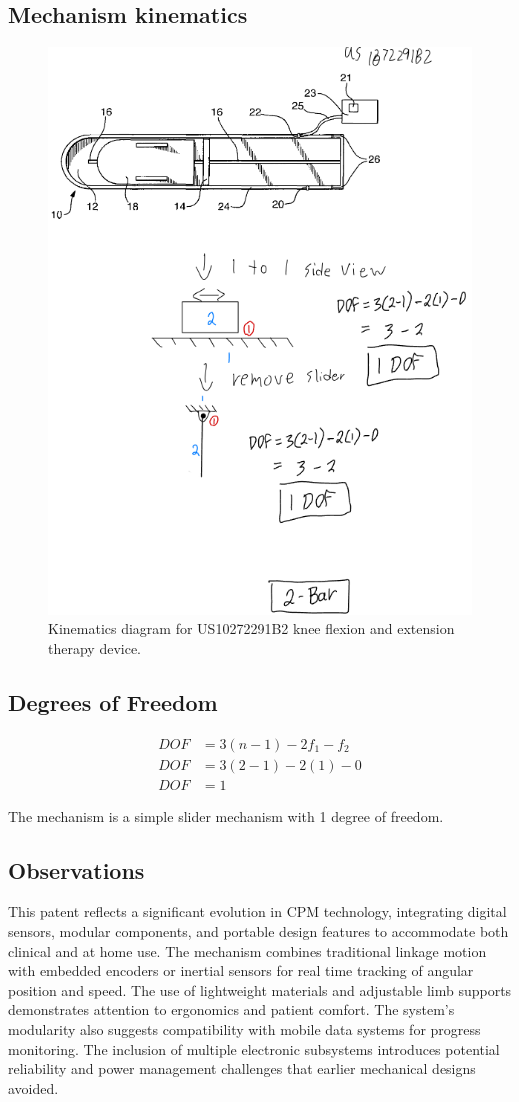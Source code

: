 \documentclass[11pt]{article}
\begin{document}
\subsection{Mechanism kinematics}
\begin{figure}[H]
  \centering
  \includegraphics[width=0.54\linewidth]{../Kinematic Mechanism Images/10272291.png}
  \caption{Kinematics diagram for US10272291B2 knee flexion and extension therapy device.}
  \label{fig:US10272291B2_kinematics}
\end{figure}

\subsection{Degrees of Freedom}
\[
\begin{aligned}
DOF &= 3(n-1) - 2f_1 - f_2 \\
DOF &= 3(2-1) - 2(1) - 0 \\
DOF &= 1
\end{aligned}
\]

The mechanism is a simple slider mechanism with 1 degree of freedom.

\subsection{Observations}
This patent reflects a significant evolution in CPM technology, integrating digital sensors, modular components, and portable design features to accommodate both clinical and at home use. The mechanism combines traditional linkage motion with embedded encoders or inertial sensors for real time tracking of angular position and speed. The use of lightweight materials and adjustable limb supports demonstrates attention to ergonomics and patient comfort. The system's modularity also suggests compatibility with mobile data systems for progress monitoring. The inclusion of multiple electronic subsystems introduces potential reliability and power management challenges that earlier mechanical designs avoided.
\end{document}
